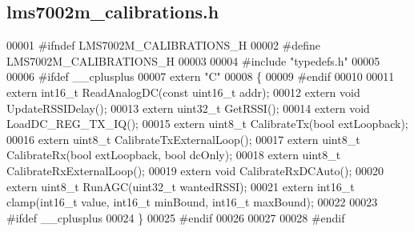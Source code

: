 \subsection{lms7002m\+\_\+calibrations.\+h}
\label{lms7002m__calibrations_8h_source}

\begin{DoxyCode}
00001 \textcolor{preprocessor}{#ifndef LMS7002M\_CALIBRATIONS\_H}
00002 \textcolor{preprocessor}{#define LMS7002M\_CALIBRATIONS\_H}
00003 
00004 \textcolor{preprocessor}{#include "typedefs.h"}
00005 
00006 \textcolor{preprocessor}{#ifdef \_\_cplusplus}
00007 \textcolor{keyword}{extern} \textcolor{stringliteral}{"C"}
00008 \{
00009 \textcolor{preprocessor}{#endif}
00010 
00011 \textcolor{keyword}{extern} int16\_t ReadAnalogDC(\textcolor{keyword}{const} uint16\_t addr);
00012 \textcolor{keyword}{extern} \textcolor{keywordtype}{void} UpdateRSSIDelay();
00013 \textcolor{keyword}{extern} uint32\_t GetRSSI();
00014 \textcolor{keyword}{extern} \textcolor{keywordtype}{void} LoadDC_REG_TX_IQ();
00015 \textcolor{keyword}{extern} uint8\_t CalibrateTx(\textcolor{keywordtype}{bool} extLoopback);
00016 \textcolor{keyword}{extern} uint8\_t CalibrateTxExternalLoop();
00017 \textcolor{keyword}{extern} uint8\_t CalibrateRx(\textcolor{keywordtype}{bool} extLoopback, \textcolor{keywordtype}{bool} dcOnly);
00018 \textcolor{keyword}{extern} uint8\_t CalibrateRxExternalLoop();
00019 \textcolor{keyword}{extern} \textcolor{keywordtype}{void} CalibrateRxDCAuto();
00020 \textcolor{keyword}{extern} uint8\_t RunAGC(uint32\_t wantedRSSI);
00021 \textcolor{keyword}{extern} int16\_t clamp(int16\_t value, int16\_t minBound, int16\_t maxBound);
00022 
00023 \textcolor{preprocessor}{#ifdef \_\_cplusplus}
00024 \}
00025 \textcolor{preprocessor}{#endif}
00026 
00027 
00028 \textcolor{preprocessor}{#endif}
\end{DoxyCode}
